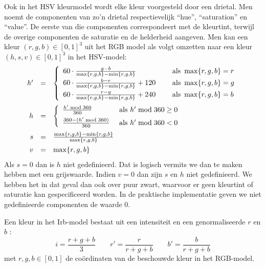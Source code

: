Ook in het HSV kleurmodel \cite{tkalcic:colour_spaces} wordt elke kleur voorgesteld 
door een drietal. Men noemt de componenten van zo'n drietal respectievelijk 
``hue'', ``saturation'' en ``value''. De eerste van die componenten 
correspondeert met de kleurtint, terwijl de overige componenten de saturatie
en de helderheid aangeven. Men kan een kleur $(r,g,b) \in [0,1]^3$ uit het RGB 
model als volgt omzetten naar een kleur $(h,s,v) \in [0,1]^3$ in het HSV-model: 
$$
\begin{array}{rcl}
h' & = & \left\{ \begin{array}{ll}
60 \cdot \frac{g - b}{\max \{r,g,b\} - \min \{r,g,b\}}\quad & \textrm{ als } \max \{r,g,b\} = r \\[4pt]
60 \cdot \frac{b - r}{\max \{r,g,b\} - \min \{r,g,b\}} + 120\quad & \textrm{ als } \max \{r,g,b\} = g \\[4pt]
60 \cdot \frac{r - g}{\max \{r,g,b\} - \min \{r,g,b\}} + 240\quad & \textrm{ als } \max \{r,g,b\} = b
\end{array} \right. \vspace{6pt} \\
h & = & \left\{ \begin{array}{ll} 
\frac{h' \bmod 360}{360} & \textrm{ als } h' \bmod 360 \geq 0 \\[4pt] 
\frac{360 - (h' \bmod 360)}{360} & \textrm{ als } h' \bmod 360 < 0 
\end{array} \right. \vspace{6pt} \\
s & = & \frac{\max \{r,g,b\} - \min \{r,g,b\}}{\max \{r,g,b\}} \\[6pt] 
v & = & \max \{r,g,b\}
\end{array}
$$ Als $s=0$ dan is $h$ niet gedefinieerd. Dat is logisch vermits we dan te 
maken hebben met een grijswaarde. Indien $v=0$ dan zijn $s$ en $h$ niet gedefinieerd. We 
hebben het in dat geval dan ook over puur zwart, waarvoor er geen kleurtint of 
saturatie kan gespecificeerd worden. In de praktische implementatie geven we 
niet gedefinieerde componenten de waarde $0$.

Een kleur in het Irb-model bestaat uit een intensiteit en een genormaliseerde $r$ en $b$ 
\cite{ohta:color_info_for_region_segm}: $$ i = \frac{r+g+b}{3} \qquad r' = 
\frac{r}{r+g+b} \qquad b' = \frac{b}{r+g+b} $$ met $r,g,b \in [0,1]$ 
de co\"ordinaten van de beschouwde kleur in het RGB-model. 

